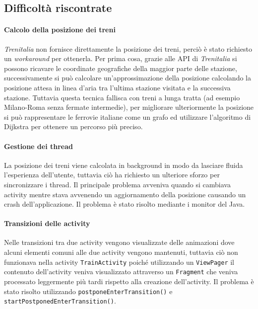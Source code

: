 \documentclass[a4paper,10pt]{article}
\begin{document}
  \subsection{Difficoltà riscontrate}
    \paragraph{Calcolo della posizione dei treni}
      \emph{Trenitalia} non fornisce direttamente la posizione dei treni, perciò è stato richiesto un \emph{workaround} per ottenerla. Per prima cosa, grazie alle API di \emph{Trenitalia} \cite{tiapi} si possono ricavare le coordinate geografiche della maggior parte delle stazione, successivamente si può calcolare un'approssimazione della posizione calcolando la posizione attesa in linea d'aria tra l'ultima stazione visitata e la successiva stazione. Tuttavia questa tecnica fallisca con treni a lunga tratta (ad esempio Milano-Roma senza fermate intermedie), per migliorare ulteriormente la posizione si può rappresentare le ferrovie italiane come un grafo ed utilizzare l'algoritmo di Dijkstra \cite{dijkstra} per ottenere un percorso più preciso.

    \paragraph{Gestione dei thread}
      La posizione dei treni viene calcolata in background in modo da lasciare fluida l'esperienza dell'utente, tuttavia ciò ha richiesto un ulteriore sforzo per sincronizzare i thread. Il principale problema avveniva quando si cambiava activity mentre stava avvenendo un aggiornamento della posizione causando un crash dell'applicazione. Il problema è stato risolto mediante i monitor del Java.

    \paragraph{Transizioni delle activity}
      Nelle transizioni tra due activity vengono visualizzate delle animazioni \cite{sharedelements} dove alcuni elementi comuni alle due activity vengono mantenuti, tuttavia ciò non funzionava nella activity \texttt{TrainActivity} poiché utilizzando un \texttt{ViewPager} il contenuto dell'activity veniva visualizzato attraverso un \texttt{Fragment} che veniva processato leggermente più tardi rispetto alla creazione dell'activity. Il problema è stato risolto utilizzando \texttt{postponeEnterTransition()} e \texttt{startPostponedEnterTransition()}.
\end{document}
